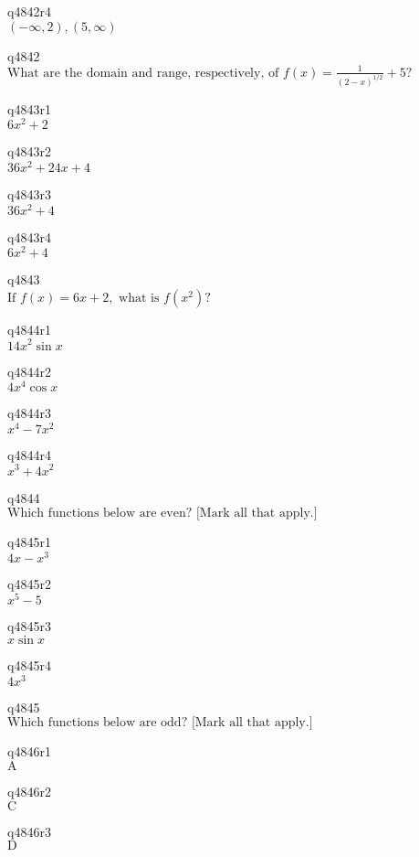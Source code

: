 q4842r4\\
\(\displaystyle (-\infty, 2), (5, \infty) \)

q4842\\
\(\displaystyle \text{What are the domain and range, respectively, of } f(x) = \frac{1}{(2-x)^{1/2}} + 5? \)

q4843r1\\
\(\displaystyle 6x^2 + 2 \)

q4843r2\\
\(\displaystyle 36x^2 + 24x + 4 \)

q4843r3\\
\(\displaystyle 36x^2 + 4 \)

q4843r4\\
\(\displaystyle 6x^2 + 4 \)

q4843\\
\(\displaystyle \text{If } f(x) = 6x + 2, \text{ what is } f(x^2)? \)

q4844r1\\
\(\displaystyle 14x^2 \sin x \)

q4844r2\\
\(\displaystyle 4x^4 \cos x \)

q4844r3\\
\(\displaystyle x^4 - 7x^2 \)

q4844r4\\
\(\displaystyle x^3 + 4x^2 \)

q4844\\
\(\displaystyle \text{Which functions below are even? [Mark all that apply.]} \)

q4845r1\\
\(\displaystyle 4x - x^3 \)

q4845r2\\
\(\displaystyle x^5 - 5 \)

q4845r3\\
\(\displaystyle x \sin x \)

q4845r4\\
\(\displaystyle 4x^3 \)

q4845\\
\(\displaystyle \text{Which functions below are odd? [Mark all that apply.]} \)

q4846r1\\
\(\displaystyle \text{A} \)

q4846r2\\
\(\displaystyle \text{C} \)

q4846r3\\
\(\displaystyle \text{D} \)

